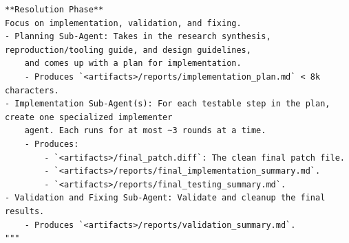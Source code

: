 \begin{listing}[H]
{\begin{lstlisting}[rulecolor=\color{accentShell}]
**Resolution Phase**
Focus on implementation, validation, and fixing.
- Planning Sub-Agent: Takes in the research synthesis, reproduction/tooling guide, and design guidelines,
    and comes up with a plan for implementation.
    - Produces `<artifacts>/reports/implementation_plan.md` < 8k characters.
- Implementation Sub-Agent(s): For each testable step in the plan, create one specialized implementer
    agent. Each runs for at most ~3 rounds at a time.
    - Produces:
        - `<artifacts>/final_patch.diff`: The clean final patch file.
        - `<artifacts>/reports/final_implementation_summary.md`.
        - `<artifacts>/reports/final_testing_summary.md`.
- Validation and Fixing Sub-Agent: Validate and cleanup the final results.
    - Produces `<artifacts>/reports/validation_summary.md`.
"""
\end{lstlisting}
}
\caption{\sysname lite single-meta agent prompt for SWE tasks.}
\label{lst:singlemeta_prompt}
\end{listing}


